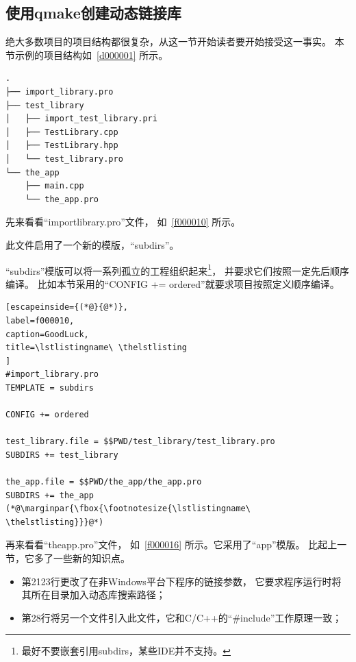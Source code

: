 %
% 
\FloatBarrier
\subsection{
使用qmake创建动态链接库
}\label{ss000710}


绝大多数项目的项目结构都很复杂，从这一节开始读者要开始接受这一事实。
本节示例的项目结构如\treeindexnumbernameone\ \ref{d000001}
所示。

\FloatBarrier
{}\label{d000001}    %
\begin{lstlisting}[caption=GoodLuck,
numbers=none,
title=\treeindexnumbernameone\ \thetreeindexnumber
]
.
├── import_library.pro
├── test_library
│   ├── import_test_library.pri
│   ├── TestLibrary.cpp
│   ├── TestLibrary.hpp
│   └── test_library.pro
└── the_app
    ├── main.cpp
    └── the_app.pro
\end{lstlisting}          %
\marginpar{\raisebox{1.65ex}{\fbox{\footnotesize{\treeindexnumbernameone\ \thetreeindexnumber}}}} %


先来看看“import\underline{\hspace{0.5em}}library.pro”文件，
如\lstlistingname\ \ref{f000010}
所示。

此文件启用了一个新的模版，“subdirs”。

“subdirs”模版可以将一系列孤立的工程组织起来\footnote{
最好不要嵌套引用subdirs，某些IDE并不支持。
}，
并要求它们按照一定先后顺序编译。
比如本节采用的“CONFIG {\sourcefonttwo{}+}{\sourcefonttwo{}=} ordered”就要求项目按照定义顺序编译。

\FloatBarrier
\begin{lstlisting}[escapeinside={(*@}{@*)},
label=f000010,
caption=GoodLuck,
title=\lstlistingname\ \thelstlisting
]
#import_library.pro
TEMPLATE = subdirs

CONFIG += ordered

test_library.file = $$PWD/test_library/test_library.pro
SUBDIRS += test_library

the_app.file = $$PWD/the_app/the_app.pro
SUBDIRS += the_app
(*@\marginpar{\fbox{\footnotesize{\lstlistingname\ \thelstlisting}}}@*)\end{lstlisting}          %


再来看看“the\underline{\hspace{0.5em}}app.pro”文件，
如\lstlistingname\ \ref{f000016} 所示。它采用了“app”模版。
比起上一节，它多了一些新的知识点。
\begin{itemize}
\item 第21\raisebox{0.16ex}{\sourcefonttwo\~{}}23行更改了在非Windows平台下程序的链接参数，
它要求程序运行时将其所在目录加入动态库搜索路径；
\item 第28行将另一个文件引入此文件，它和C/C{\sourcefonttwo{}+}{\sourcefonttwo{}+}的“{\sourcefonttwo\#}include”工作原理一致；
\end{itemize}

